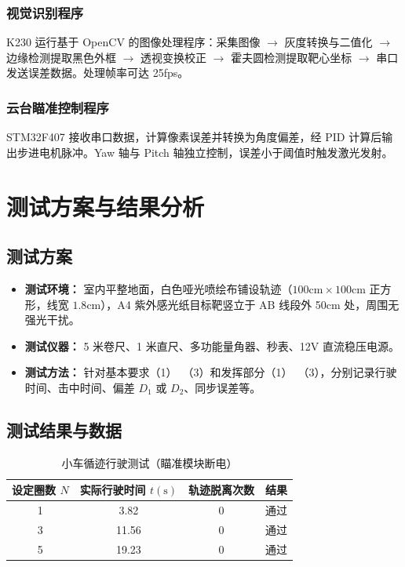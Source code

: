 \documentclass[zihao=-4,fontset=none]{ctexart}
\begin{document}
\subsubsection{视觉识别程序}
K230 运行基于 OpenCV 的图像处理程序：采集图像 $\to$ 灰度转换与二值化 $\to$ 边缘检测提取黑色外框 $\to$ 透视变换校正 $\to$ 霍夫圆检测提取靶心坐标 $\to$ 串口发送误差数据。处理帧率可达 25fps。

\subsubsection{云台瞄准控制程序}
STM32F407 接收串口数据，计算像素误差并转换为角度偏差，经 PID 计算后输出步进电机脉冲。Yaw 轴与 Pitch 轴独立控制，误差小于阈值时触发激光发射。

\section{测试方案与结果分析}

\subsection{测试方案}
\begin{itemize}
    \item \textbf{测试环境：} 室内平整地面，白色哑光喷绘布铺设轨迹（$100\text{cm}\times100\text{cm}$ 正方形，线宽 $1.8\text{cm}$），A4 紫外感光纸目标靶竖立于 AB 线段外 50cm 处，周围无强光干扰。
    \item \textbf{测试仪器：} 5 米卷尺、1 米直尺、多功能量角器、秒表、12V 直流稳压电源。
    \item \textbf{测试方法：} 针对基本要求（1）~（3）和发挥部分（1）~（3），分别记录行驶时间、击中时间、偏差 $D_1$ 或 $D_2$、同步误差等。
\end{itemize}

\subsection{测试结果与数据}

\begin{table}[H]
    \centering
    \caption{小车循迹行驶测试（瞄准模块断电）}
    \label{tab:e_track}
    \begin{tabular}{cccc}
        \toprule
        设定圈数 $N$ & 实际行驶时间 $t(\text{s})$ & 轨迹脱离次数 & 结果 \\
        \midrule
        1 & 3.82 & 0 & 通过 \\
        3 & 11.56 & 0 & 通过 \\
        5 & 19.23 & 0 & 通过 \\
        \bottomrule
    \end{tabular}
\end{table}
\end{document}

